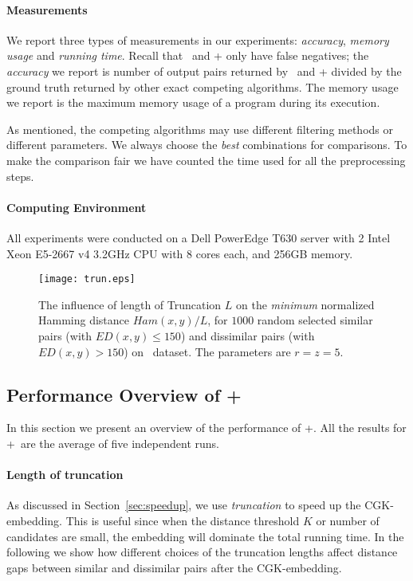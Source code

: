\paragraph{Measurements}
We report three types of measurements in our experiments: {\em accuracy}, {\em memory usage} and {\em running time}.  Recall that \ebdjoin\ and \ebdjoin+ only have false negatives; the {\em accuracy} we report is number of output pairs returned by \ebdjoin\ and \ebdjoin+ divided by the ground truth returned by other exact competing algorithms.  The memory usage we report is the maximum memory usage of a program during its execution. 

As mentioned, the competing algorithms may use different filtering methods or different parameters. We always choose the {\em best} combinations for comparisons.  To make the comparison fair we have counted the time used for all the preprocessing steps.

\paragraph{Computing Environment}
All experiments were conducted on a Dell PowerEdge T630 server with 2 Intel Xeon E5-2667 v4 3.2GHz CPU with 8 cores each, and 256GB memory.


\begin{figure}[t]
\centering
\texttt{[image: trun.eps]}
\caption{The influence of length of Truncation $L$ on the {\em minimum} normalized Hamming distance $Ham(x,y)/L$, for $1000$ random selected similar pairs (with $ED(x,y) \le 150$) and dissimilar pairs (with $ED(x,y) > 150$) on \genoa\ dataset. The parameters are $r=z=5$.}
\label{fig:trun}
\end{figure}


\subsection{Performance Overview of \ebdjoin+}
\label{sec:embed-exp}

In this section we present an overview of the performance of \ebdjoin+.   All the results for \ebdjoin+\ are the average of five independent runs. 

\paragraph{Length of truncation}
As discussed in Section~\ref{sec:speedup}, we use {\em truncation} to speed up the CGK-embedding.  This is useful since when the distance threshold $K$ or number of candidates are small, the embedding will dominate the total running time.  In the following we show how different choices of the truncation lengths affect distance gaps between similar and dissimilar pairs after the CGK-embedding.


